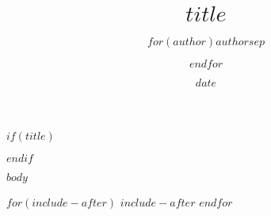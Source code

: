 \documentclass[a4paper]{tufte-handout}
\title{$title$}
\author{$for(author)$$author$$sep$ \and $endfor$}
\date{$date$}
\begin{document}
$if(title)$
\maketitle
$endif$
 
$body$
 
$for(include-after)$
$include-after$
$endfor$
\end{document}
